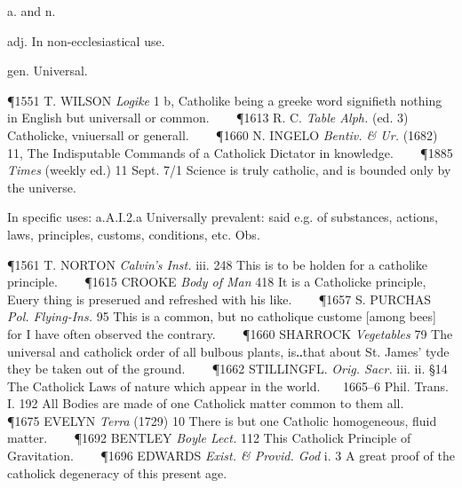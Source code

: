 \begin{description}[wide, labelwidth=!, labelindent=0pt]
 a. and n.

\noindent {}


\begin{myenumerate}
 adj. In non-ecclesiastical use.

 gen. Universal.

\P 1551 T. WILSON  \textit{Logike} 1 b, Catholike being a greeke word signifieth nothing in English but universall or common.    
\P 1613 R. C. \textit{Table  Alph.} (ed. 3) Catholicke, vniuersall or generall.    
\P 1660 N. INGELO  \textit{Bentiv. \& Ur.} (1682) 11, The Indisputable Commands of a Catholick Dictator in knowledge.    
\P 1885  \textit{Times} (weekly ed.) 11 Sept. 7/1 Science is truly catholic, and is bounded only by the universe.

 In specific uses: a.A.I.2.a Universally prevalent: said e.g. of substances, actions, laws, principles, customs, conditions, etc. Obs.

\P 1561 T. NORTON  \textit{Calvin's Inst.} iii. 248 This is to be holden for a catholike principle.    
\P 1615 CROOKE  \textit{Body of Man} 418 It is a Catholicke principle, Euery thing is preserued and refreshed with his like.    
\P 1657 S. PURCHAS  \textit{Pol. Flying-Ins.} 95 This is a common, but no catholique custome [among bees] for I have often observed the contrary.    
\P 1660 SHARROCK  \textit{Vegetables} 79 The universal and catholick order of all bulbous plants, is‥that about St. James' tyde they be taken out of the ground.    
\P 1662 STILLINGFL.  \textit{Orig. Sacr.} iii. ii. §14 The Catholick Laws of nature which appear in the world.    1665–6 Phil. Trans. I. 192 All Bodies are made of one Catholick matter common to them all.    
\P 1675 EVELYN  \textit{Terra} (1729) 10 There is but one Catholic homogeneous, fluid matter.    
\P 1692 BENTLEY  \textit{Boyle Lect.} 112 This Catholick Principle of Gravitation.    
\P 1696 EDWARDS  \textit{Exist. \& Provid. God} i. 3 A great proof of the catholick degeneracy of this present age.


\end{myenumerate}
\end{description}
